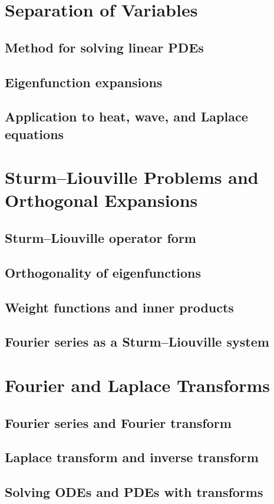\section{Separation of Variables}
\subsection{Method for solving linear PDEs}
\subsection{Eigenfunction expansions}
\subsection{Application to heat, wave, and Laplace equations}

\section{Sturm--Liouville Problems and Orthogonal Expansions}
\subsection{Sturm--Liouville operator form}
\subsection{Orthogonality of eigenfunctions}
\subsection{Weight functions and inner products}
\subsection{Fourier series as a Sturm--Liouville system}

\section{Fourier and Laplace Transforms}
\subsection{Fourier series and Fourier transform}
\subsection{Laplace transform and inverse transform}
\subsection{Solving ODEs and PDEs with transforms}
